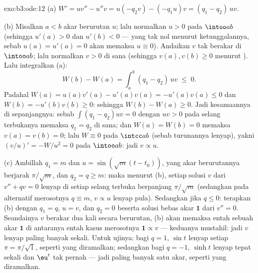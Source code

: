 \begin{solution}{exo:b3:ode:12}
(a) $W' = uv'' - u''v = u(-q_2v) - (-q_1u)v = (q_1 -
q_2)\,uv$.

(b) Misalkan $a < b$ akar berurutan $u$; lalu normalkan $u >
0$ pada $\intoo ab$ (sehingga $u'(a) > 0$ dan $u'(b) < 0$ --- yang tak nol
menurut ketunggalannya, sebab $u(a) = u'(a) = 0$ akan memaksa $u
\equiv 0$). Andaikan $v$ tak berakar di $\intoo ab$;
lalu normalkan $v > 0$ di sana (sehingga $v(a), v(b) \geq 0$ menurut
). Lalu integralkan (a):
\[
W(b) - W(a) = \int_a^b(q_1 - q_2)\,uv \;\leq\; 0 .
\]
Padahal $W(a) = u(a)v'(a) - u'(a)v(a) = -u'(a)v(a) \leq 0$ dan
$W(b) = -u'(b)v(b) \geq 0$: sehingga $W(b) - W(a) \geq 0$.
Jadi kesamaannya di sepanjangnya: sebab $\int(q_1 - q_2)uv = 0$ dengan $uv > 0$
pada selang terbukanya memaksa $q_1 = q_2$ di sana; dan $W(a) =
W(b) = 0$ memaksa $v(a) = v(b) = 0$; lalu $W \equiv 0$ pada
$\intcc ab$ (sebab turunannya lenyap), yakni
$(v/u)' = -W/u^2 = 0$ pada $\intoo ab$: jadi $v \propto u$.

(c) Ambillah $q_1 = m$ dan $u = \sin(\sqrt m(t - t_0))$, yang
akar berurutannya berjarak $\pi/\sqrt m$, dan $q_2 = q \geq
m$: maka menurut (b), setiap solusi $v$ dari $v'' + qv = 0$ lenyap di
setiap selang terbuka berpanjang $\pi/\sqrt m$ (sedangkan pada
alternatif merosotnya $q \equiv m$, $v \propto u$ lenyap
pula). Sedangkan jika $q \leq 0$: terapkan (b) dengan $q_1 = q$, $u =
v$, dan $q_2 = 0$ beserta solusi bebas akar $\mathbf 1$ dari
$v'' = 0$. Seandainya $v$ berakar dua kali secara berurutan, (b) akan memaksa
entah sebuah akar $\mathbf 1$ di antaranya entah kasus
merosotnya $\mathbf 1 \propto v$ --- keduanya mustahil: jadi $v$ lenyap
paling banyak sekali. Untuk ujinya: bagi $q = 1$, $\sin t$ lenyap setiap $\pi
= \pi/\sqrt1$, seperti yang diramalkan; sedangkan bagi $q = -1$, $\sinh t$
lenyap tepat sekali dan $\eu^t$ tak pernah --- jadi paling banyak satu
akar, seperti yang diramalkan.
\end{solution}

